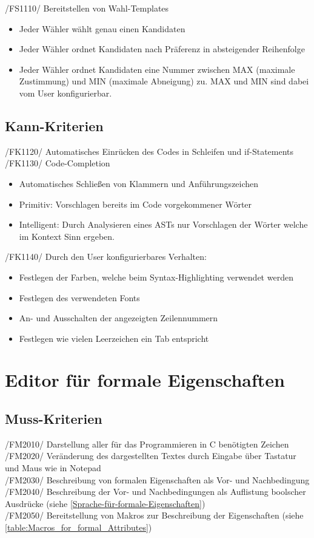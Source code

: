 \documentclass[a4paper]{scrreprt}
\begin{document}
/FS1110/ Bereitstellen von Wahl-Templates
\begin{itemize}
\item Jeder Wähler wählt genau einen Kandidaten
\item Jeder Wähler ordnet Kandidaten nach Präferenz in absteigender Reihenfolge 
\item Jeder Wähler ordnet Kandidaten eine Nummer zwischen MAX (maximale Zustimmung) und MIN (maximale Abneigung) zu. MAX und MIN sind dabei vom User konfigurierbar. 
\end{itemize}

\subsection{Kann-Kriterien}
/FK1120/ Automatisches Einrücken des Codes in Schleifen und if-Statements \\
/FK1130/ Code-Completion
\begin{itemize}
\item Automatisches Schließen von Klammern und Anführungszeichen
\item Primitiv: Vorschlagen bereits im Code vorgekommener Wörter
\item Intelligent: Durch Analysieren eines ASTs nur Vorschlagen der Wörter welche im Kontext Sinn ergeben.
\end{itemize}

/FK1140/ Durch den User konfigurierbares Verhalten:
\begin{itemize}
\item Festlegen der Farben, welche beim Syntax-Highlighting verwendet werden
\item Festlegen des verwendeten Fonts
\item An- und Ausschalten der angezeigten Zeilennummern
\item Festlegen wie vielen Leerzeichen ein Tab entspricht
\end{itemize}
 
\section{Editor für formale Eigenschaften}
\subsection{Muss-Kriterien}
/FM2010/ Darstellung aller für das Programmieren in C benötigten Zeichen \\
/FM2020/ Veränderung des dargestellten Textes durch Eingabe über Tastatur und Maus wie in Notepad \\
/FM2030/ Beschreibung von formalen Eigenschaften als Vor- und Nachbedingung  \\
/FM2040/ Beschreibung der Vor- und Nachbedingungen als Auflistung boolscher Ausdrücke (siehe \ref{Sprache-für-formale-Eigenschaften})\\
/FM2050/ Bereitstellung von Makros zur Beschreibung der Eigenschaften (siehe \ref{table:Macros_for_formal_Attributes}) \\
\end{document}
